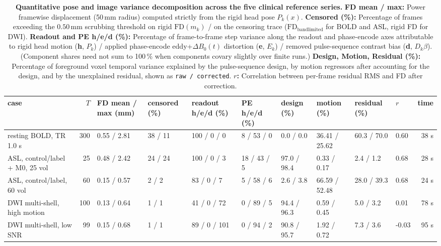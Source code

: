 \documentclass[11pt]{article}
\begin{document}
\begin{landscape}
\begin{table}[p]
\centering
\caption{\textbf{Quantitative pose and image variance decomposition across the five clinical reference series.}
\textbf{FD mean / max:} Power framewise displacement (50\,mm radius) computed strictly from the rigid head pose $P_k(x)$.
\textbf{Censored (\%):} Percentage of frames exceeding the $0.50$\,mm scrubbing threshold on rigid $\text{FD}(m_k)$ / on the censoring trace ($\text{FD}_{\text{bandlimited}}$ for BOLD and ASL, rigid FD for DWI).
\textbf{Readout and PE h/e/d (\%):} Percentage of frame-to-frame step variance along the readout and phase-encode axes attributable to rigid head motion (\textbf{h}, $P_k$) / applied phase-encode eddy+$\Delta B_0(t)$ distortion (\textbf{e}, $E_k$) / removed pulse-sequence contrast bias (\textbf{d}, $D_k\beta$). (Component shares need not sum to 100\,\% when components covary slightly over finite runs.)
\textbf{Design, Motion, Residual (\%):} Percentage of foreground voxel temporal variance explained by the pulse-sequence design, by motion regressors after accounting for the design, and by the unexplained residual, shown as \texttt{raw / corrected}.
\textbf{$r$:} Correlation between per-frame residual RMS and FD after correction.}
\scriptsize
\setlength{\tabcolsep}{2.2pt}
\begin{tabular}{lrllllllllr}
\toprule
case & $T$ & FD mean / max (mm) & censored (\%) & readout h/e/d (\%) & PE h/e/d (\%) & design (\%) & motion (\%) & residual (\%) & $r$ & time \\
\midrule
resting BOLD, TR 1.0 s & 300 & 0.55 / 2.81 & 38 / 11 & 100 / 0 / 0 & 8 / 53 / 0 & 0.0 / 0.0 & 36.41 / 25.62 & 60.3 / 70.0 & 0.60 & 38 s \\
ASL, control/label + M0, 25 vol & 25 & 0.48 / 2.42 & 24 / 24 & 100 / 0 / 3 & 18 / 43 / 5 & 97.0 / 98.4 & 0.33 / 0.17 & 2.4 / 1.2 & 0.68 & 28 s \\
ASL, control/label, 60 vol & 60 & 0.15 / 0.57 & 2 / 2 & 83 / 0 / 7 & 5 / 58 / 6 & 2.6 / 3.8 & 66.59 / 52.48 & 28.0 / 39.3 & 0.68 & 24 s \\
DWI multi-shell, high motion & 100 & 0.13 / 0.64 & 1 / 1 & 41 / 0 / 72 & 0 / 89 / 5 & 94.4 / 96.3 & 0.59 / 0.45 & 5.0 / 3.2 & 0.01 & 78 s \\
DWI multi-shell, low SNR & 99 & 0.15 / 0.68 & 1 / 1 & 89 / 0 / 101 & 0 / 94 / 2 & 90.8 / 95.7 & 1.92 / 0.72 & 7.3 / 3.6 & -0.03 & 95 s \\
\bottomrule
\end{tabular}
\label{tab:results}
\end{table}


\end{landscape}
\end{document}
